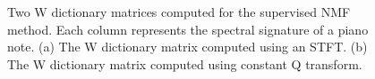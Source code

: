 \documentclass[5p]{elsarticle}
\begin{document}

\begin{figure}[t]
\begin{center}
\end{center}
\caption{ Two W dictionary matrices computed for the supervised NMF method. Each column represents the spectral signature of a piano note. (a) The W dictionary matrix computed using an STFT. (b) The W dictionary matrix computed using constant Q transform.}
\end{figure}
\end{document}
